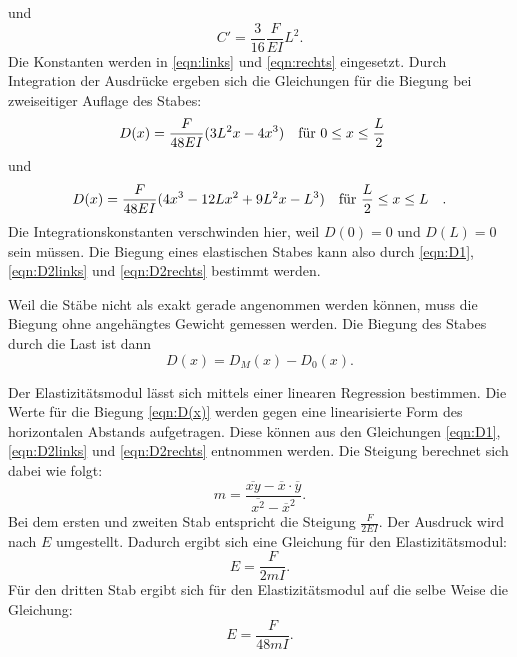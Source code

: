 und
\begin{equation*}
C' = \frac{3}{16} \frac{F}{EI} L^2.
\end{equation*}
Die Konstanten werden in \eqref{eqn:links} und \eqref{eqn:rechts}
eingesetzt. Durch Integration der Ausdrücke ergeben sich die Gleichungen
für die Biegung bei zweiseitiger Auflage des Stabes:
\begin{equation}
D(x) = \frac{F}{48EI} (3L^2x - 4x^3) \qq{für $0 \leq x \leq \frac{L}{2}$}
\label{eqn:D2links}
\end{equation}
und
\begin{equation}
D(x) = \frac{F}{48EI} (4x^3 - 12Lx^2 + 9L^2x - L^3) \qq{für $\frac{L}{2} \leq x \leq L$}.
\label{eqn:D2rechts}
\end{equation}
Die Integrationskonstanten verschwinden hier, weil $D(0) = 0$ und $D(L) = 0$ sein müssen.
Die Biegung eines elastischen Stabes kann also durch
\eqref{eqn:D1}, \eqref{eqn:D2links} und \eqref{eqn:D2rechts} bestimmt werden.

\noindent Weil die Stäbe nicht als exakt gerade angenommen werden können,
muss die Biegung ohne angehängtes Gewicht gemessen werden.
Die Biegung des Stabes durch die Last ist dann 
\begin{equation}
D(x) = D_{M}(x) - D_{0}(x).
\label{eqn:D(x)}
\end{equation}

\noindent Der Elastizitätsmodul lässt sich mittels einer
linearen Regression bestimmen. Die Werte für die Biegung \eqref{eqn:D(x)}
werden gegen eine linearisierte Form des horizontalen Abstands aufgetragen.
Diese können aus den Gleichungen \eqref{eqn:D1}, \eqref{eqn:D2links} und \eqref{eqn:D2rechts} entnommen werden.
Die Steigung berechnet sich dabei wie folgt:
\begin{equation}
m = \frac{\overline{xy} - \overline{x} \cdot \overline{y}}{\overline{x^2} - \overline{x}^2}.
\label{eqn:m}
\end{equation} %
Bei dem ersten und zweiten Stab entspricht die Steigung
$\frac{F}{2EI}$.
Der Ausdruck wird nach $E$ umgestellt. Dadurch ergibt sich
eine Gleichung für den Elastizitätsmodul:
\begin{equation}
E = \frac{F}{2mI}.
\label{eqn:E12}
\end{equation}
Für den dritten Stab ergibt sich für den Elastizitätsmodul auf die
selbe Weise die Gleichung:
\begin{equation}
E = \frac{F}{48mI}.
\label{eqn:E3}
\end{equation}

